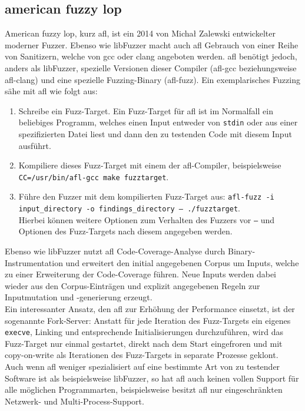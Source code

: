 \documentclass[a4paper]{article}
\begin{document}
\subsection{american fuzzy lop}
American fuzzy lop\cite{afl}, kurz afl, ist ein 2014 von Michał Zalewski entwickelter moderner Fuzzer. 
Ebenso wie libFuzzer macht auch afl Gebrauch von einer Reihe von Sanitizern, welche von gcc oder clang angeboten werden. 
afl benötigt jedoch, anders als libFuzzer, spezielle Versionen dieser Compiler (afl-gcc beziehungsweise afl-clang) und eine spezielle Fuzzing-Binary (afl-fuzz).
Ein exemplarisches Fuzzing sähe mit afl wie folgt aus:
\begin{enumerate}
    \item Schreibe ein Fuzz-Target. Ein Fuzz-Target für afl ist im Normalfall ein beliebiges Programm, welches einen Input entweder von \texttt{stdin} oder aus einer spezifizierten Datei liest und dann den zu testenden Code mit diesem Input ausführt.
    \item Kompiliere dieses Fuzz-Target mit einem der afl-Compiler, beispielsweise \texttt{CC=/usr/bin/afl-gcc make fuzztarget}.
    \item Führe den Fuzzer mit dem kompilierten Fuzz-Target aus: \texttt{afl-fuzz -i input\_directory -o findings\_directory -- ./fuzztarget}.\\ Hierbei können weitere Optionen zum Verhalten des Fuzzers vor \texttt{--} und Optionen des Fuzz-Targets nach diesem angegeben werden.
\end{enumerate}
Ebenso wie libFuzzer nutzt afl Code-Coverage-Analyse durch Binary-Instrumen\-tation und erweitert den initial angegebenen Corpus um Inputs, welche zu einer Erweiterung der Code-Coverage führen. 
Neue Inputs werden dabei wieder aus den Corpus-Einträgen und explizit angegebenen Regeln zur Inputmutation und -generierung erzeugt.\\
Ein interessanter Ansatz, den afl zur Erhöhung der Performance einsetzt, ist der sogenannte Fork-Server\cite{afl}: Anstatt für jede Iteration des Fuzz-Targets ein eigenes \texttt{execve}, Linking und entsprechende Initialisierungen durchzuführen, wird das Fuzz-Target nur einmal gestartet, direkt nach dem Start eingefroren und mit copy-on-write als Iterationen des Fuzz-Targets in separate Prozesse geklont.\\
Auch wenn afl weniger spezialisiert auf eine bestimmte Art von zu testender Software ist als beispielsweise libFuzzer, so hat afl auch keinen vollen Support für alle möglichen Programmarten, beispielsweise besitzt afl nur eingeschränkten Netzwerk- und Multi-Process-Support.
\end{document}
